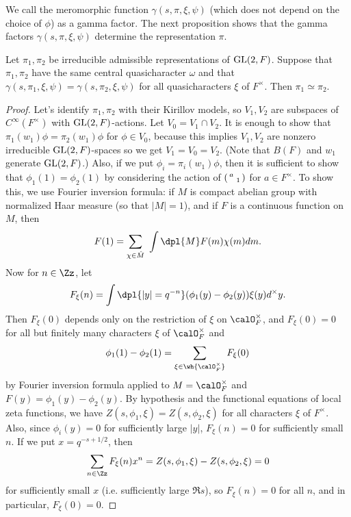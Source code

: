 We call the meromorphic function $\gamma(s, \pi, \xi, \psi)$ (which does not depend on the choice of $\phi$) as a gamma factor. 
The next proposition shows that the gamma factors $\gamma(s, \pi, \xi, \psi)$ determine the representation $\pi$. 
\begin{proposition}
Let $\pi_1, \pi_2$ be irreducible admissible representations of $\mathrm{GL}(2, F)$. 
Suppose that $\pi_1, \pi_2$ have the same central quasicharacter $\omega$ and that $\gamma(s, \pi_1, \xi, \psi) = \gamma(s, \pi_2, \xi, \psi)$ for all quasicharacters $\xi$ of $F^{\times}$. 
Then $\pi_1\simeq \pi_2$. 
\end{proposition}
\begin{proof}
Let's identify $\pi_1, \pi_2$ with their Kirillov models, so $V_1, V_2$ are subspaces of $C^{\infty}(F^{\times})$ with $\mathrm{GL}(2, F)$-actions. 
Let $V_0 = V_1 \cap V_2$. 
It is enough to show that $\pi_1(w_1)\phi = \pi_2(w_1)\phi$ for $\phi\in V_0$, because this implies $V_1, V_2$ are nonzero irreducible $\mathrm{GL}(2, F)$-spaces so we get $V_1= V_0 = V_2$. (Note that $B(F)$ and $w_1$ generate $\mathrm{GL}(2, F)$.) 
Also, if we put $\phi_i = \pi_i(w_1)\phi$, then it is sufficient to show that $\phi_1(1) = \phi_2(1)$ by considering the action of $\left(\begin{smallmatrix} a &  \\  & 1 \end{smallmatrix}\right)$ for $a\in F^{\times}$. 
To show this, we use Fourier inversion formula: if $M$ is compact abelian group with normalized Haar measure (so that $|M| = 1$), and if $F$ is a continuous function on $M$, then 
$$
F(1) = \sum_{\chi\in \hat{M}} \,\,\int\dpl{M}F(m)\chi(m)dm.
$$
Now for $n\in \Zz$, let
$$
F_{\xi}(n) = \int\dpl{|y| = q^{-n}} (\phi_1(y) - \phi_2(y))\xi(y) d^{\times}y.
$$
Then $F_{\xi}(0)$ depends only on the restriction of $\xi$ on $\calO_{F}^{\times}$, and $F_{\xi}(0) = 0$ for all but finitely many characters $\xi$ of $\calO_{F}^{\times}$ and 
$$
\phi_{1}(1) - \phi_{2}(1) = \sum_{\xi\in \wh{\calO_{F}^{\times}}} F_{\xi}(0)
$$
by Fourier inversion formula applied to $M =\calO_{F}^{\times}$ and $F(y) = \phi_{1}(y) - \phi_{2}(y)$. 
By hypothesis and the functional equations of local zeta functions, we have $Z(s, \phi_1, \xi) = Z(s, \phi_2, \xi)$ for all characters $\xi$ of $F^{\times}$. 
Also, since $\phi_i(y) = 0$ for sufficiently large $|y|$, $F_{\xi}(n) =0$ for sufficiently small $n$. If we put $x = q^{-s +1/2}$, then 
$$
\sum_{n\in \Zz} F_{\xi}(n) x^{n} = Z(s, \phi_1, \xi) - Z(s, \phi_2, \xi) = 0
$$
for sufficiently small $x$ (i.e. sufficiently large $\Re s$), so $F_{\xi}(n) = 0$ for all $n$, and in particular, $F_{\xi}(0) = 0$. 
\end{proof}

